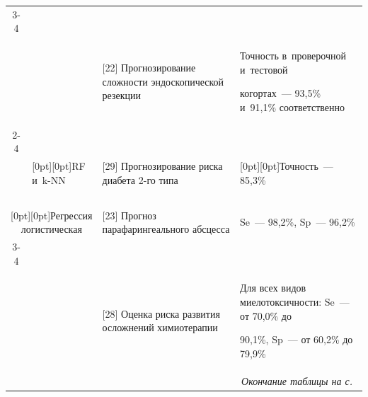 \begin{table}
{\begin{sideways}
\begin{tabular}{|c|p{22mm}|p{58mm}|p{65mm}|}
\cline{3-4}

&&&\\[-8pt]

&&[22] Прогнозирование сложности эндоскопической резекции &Точность в~проверочной и~тестовой 

когортах~--- 93,5\% и~91,1\% соответственно\\

\cline{2-4}

&&&\\[-8pt]

&\multicolumn{1}{l|}{\raisebox{-5pt}[0pt][0pt]{RF и~k-NN}}&[29] Прогнозирование риска диабета \mbox{2-го} типа&

\multicolumn{1}{l|}{\raisebox{-4pt}[0pt][0pt]{Точность~--- 85,3\%}}\\

\hline

\multicolumn{2}{|c|}{\ }&&\\[-8pt]

\multicolumn{2}{|c|}{\raisebox{-16pt}[0pt][0pt]{Регрессия логистическая}}&[23] Прогноз парафарингеального абсцесса&Se~--- 98,2\%, Sp~--- 96,2\%\\

\cline{3-4}

\multicolumn{2}{|c|}{\ }&&\\[-8pt]

\multicolumn{2}{|c|}{\ }&[28] Оценка риска развития осложнений химиотерапии&Для всех видов миелотоксичности: Se~--- от 70,0\% до 

90,1\%, Sp~--- от 60,2\% до 79,9\% \\

\hline

\multicolumn{4}{r}{\textit{Окончание таблицы на с.}~\pageref{t2-3}}

\end{tabular}

\end{sideways}

}

\end{table}




  

  


